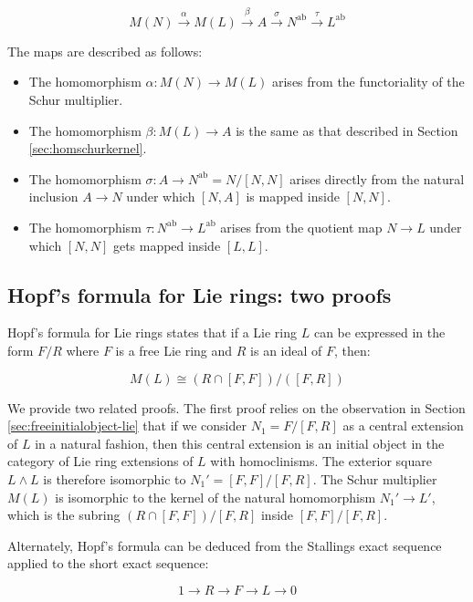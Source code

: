 $$M(N) \stackrel{\alpha}{\to} M(L) \stackrel{\beta}{\to} A \stackrel{\sigma}{\to} N^{\operatorname{ab}} \stackrel{\tau}{\to} L^{\operatorname{ab}}$$

The maps are described as follows:

\begin{itemize}
\item The homomorphism $\alpha:M(N) \to M(L)$ arises from the
  functoriality of the Schur multiplier.
\item The homomorphism $\beta:M(L) \to A$ is the same as that
  described in Section \ref{sec:homschurkernel}.
\item The homomorphism $\sigma:A \to N^{\operatorname{ab}} = N/[N,N]$
  arises directly from the natural inclusion $A \to N$ under which
  $[N,A]$ is mapped inside $[N,N]$.
\item The homomorphism $\tau:N^{\operatorname{ab}} \to
  L^{\operatorname{ab}}$ arises from the quotient map $N \to L$ under
  which $[N,N]$ gets mapped inside $[L,L]$.
\end{itemize}

\subsection{Hopf's formula for Lie rings: two proofs}\label{sec:hopf-formula-proofs-lie}

Hopf's formula for Lie rings states that if a Lie ring $L$ can be
expressed in the form $F/R$ where $F$ is a free Lie ring and $R$ is an
ideal of $F$, then:

\begin{equation}\label{eq:hopf-formula-lie}
  M(L) \cong (R \cap [F,F])/([F,R])
\end{equation}

We provide two related proofs. The first proof relies on the
observation in Section \ref{sec:freeinitialobject-lie}
that if we consider $N_1 = F/[F,R]$ as a central extension of $L$ in a
natural fashion, then this central extension is an initial object in
the category of Lie ring extensions of $L$ with homoclinisms. The
exterior square $L \wedge L$ is therefore isomorphic to $N_1' =
[F,F]/[F,R]$. The Schur multiplier $M(L)$ is isomorphic to the kernel
of the natural homomorphism $N_1' \to L'$, which is the subring $(R
\cap [F,F])/[F,R]$ inside $[F,F]/[F,R]$.

Alternately, Hopf's formula can be deduced from the Stallings exact
sequence applied to the short exact sequence:

$$1 \to R \to F \to L \to 0$$

